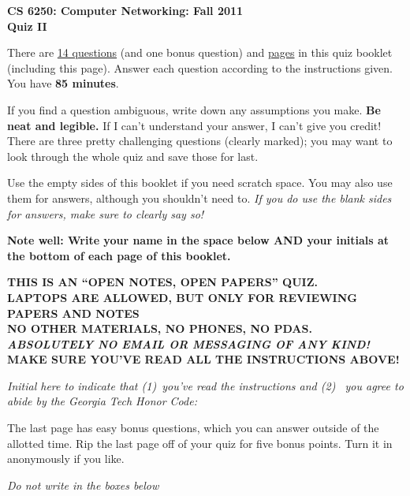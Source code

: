 \documentclass[11pt]{article}
\begin{document}
\begin{center}
{\Large{\bf CS 6250: Computer Networking: Fall 2011} \\
 \vspace{.15in} \Huge{\bf Quiz II}} 

\begin{boxedminipage}[h]{6in}
There are \underline{14 questions} (and one bonus question) and
  \underline{\pageref{lastpage} pages} in this quiz booklet (including
  this page).  Answer each question according to the instructions given.
  You have {\bf 85 minutes}.



\vspace{.1in} 
If you find a question ambiguous, write down any
assumptions you make.  {\bf Be neat and legible.}  If I can't
understand your answer, I can't give you credit!  There are three pretty
challenging questions (clearly marked); you may want to look through the
whole quiz and save those for last.

\vspace{.1in} 
Use the empty sides of this booklet if you need scratch space.  You
may also use them for answers, although you shouldn't need to.  {\em If you
do use the blank sides for answers, make sure to clearly say so!}

\vspace{.1in} 
{\bf Note well: Write your name in the space below AND your initials at the bottom of each
page of this booklet.}

\begin{center}{\bf THIS IS AN ``OPEN NOTES, OPEN PAPERS'' QUIZ.\\
LAPTOPS ARE ALLOWED, BUT ONLY FOR REVIEWING PAPERS AND NOTES \\
NO OTHER MATERIALS, NO PHONES, NO PDAS.\\
{\em ABSOLUTELY NO EMAIL OR MESSAGING OF ANY KIND!} \\
MAKE SURE YOU'VE READ ALL THE INSTRUCTIONS ABOVE!}
\end{center}
{\em Initial here to indicate that (1)~you've read the instructions and (2)~
you agree to abide by the Georgia Tech Honor Code: }

\vspace{.1in} The last page has easy bonus questions, which you can
answer outside of the allotted time.  Rip the last page off of your
quiz for five bonus points.  Turn it in anonymously if you like.

\end{boxedminipage}
\end{center}
\vspace*{0.25in}
\begin{center}
{\it Do not write in the boxes below}
\end{center}
\end{document}

